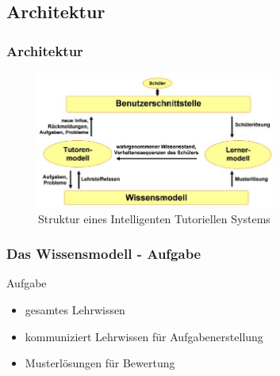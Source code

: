 \documentclass{beamer}
\begin{document}
\subsection{Architektur}
\begin{frame}
  \frametitle{Architektur}
    \begin{figure}[!htb]
    	\centering
        \includegraphics[width=0.7\textwidth]{../bilder/its_structure.jpg} %
    	\caption{Struktur eines Intelligenten Tutoriellen Systems}
    \end{figure}
\end{frame}

\begin{frame}
  \frametitle{Das Wissensmodell - Aufgabe}
  \begin{block}{Aufgabe}
    \begin{itemize}
      \item gesamtes Lehrwissen
      \item kommuniziert Lehrwissen für Aufgabenerstellung
      \item Musterlösungen für Bewertung
    \end{itemize}
  \end{block}
\end{frame}
\end{document}
